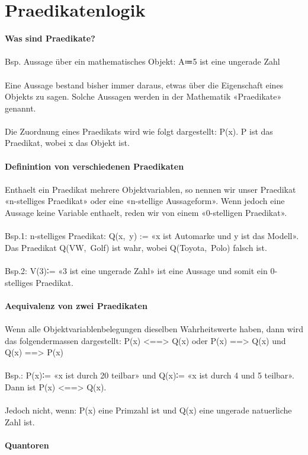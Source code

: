 \documentclass[../gruppenarbeit_1.tex]{subfiles}
\begin{document}
\section{Praedikatenlogik}

\textbf{Was sind Praedikate?}
\\
\\Bsp. Aussage über ein mathematisches Objekt: A≔5 ist eine ungerade Zahl
\\
\\Eine Aussage bestand bisher immer daraus, etwas über die Eigenschaft eines Objekts zu sagen. Solche Aussagen werden in der Mathematik «Praedikate» genannt.
\\
\\Die Zuordnung eines Praedikats wird wie folgt dargestellt: P(x). P ist das Praedikat, wobei x das Objekt ist.
\\
\\\textbf{Definintion von verschiedenen Praedikaten}
\\
\\Enthaelt ein Praedikat mehrere Objektvariablen, so nennen wir unser Praedikat «n-stelliges Praedikat» oder eine «n-stellige Aussageform». Wenn jedoch eine Aussage keine Variable enthaelt, reden wir von einem «0-stelligen Praedikat».
\\
\\Bsp.1: n-stelliges Praedikat: Q(x,\ y) := «x ist Automarke und y ist das Modell». Das Praedikat Q(VW,\ Golf) ist wahr, wobei Q(Toyota,\ Polo) falsch ist.
\\
\\Bsp.2: V(3)∶= «3 ist eine ungerade Zahl» ist eine Aussage und somit ein 0-stelliges Praedikat.
\\
\\\textbf{Aequivalenz von zwei Praedikaten}
\\
\\Wenn alle Objektvariablenbelegungen dieselben Wahrheitswerte haben, dann wird das folgendermassen dargestellt: P(x) <==> Q(x) oder P(x) ==> Q(x) und Q(x) ==> P(x)
\\
\\Bsp.: P(x)∶= «x ist durch 20 teilbar» und Q(x)∶= «x ist durch 4 und 5 teilbar». Dann ist P(x) <==> Q(x).
\\
\\Jedoch nicht, wenn: P(x) eine Primzahl ist und Q(x) eine ungerade natuerliche Zahl ist.
\\
\\\textbf{Quantoren}
\\
\end{document}
